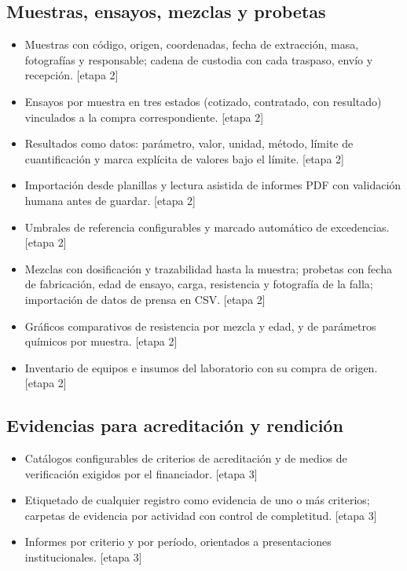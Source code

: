 \documentclass[11pt,a4paper]{article}
\newcommand{\etapa}[1]{\textcolor{grismedio}{[etapa #1]}}
\begin{document}
\subsection{Muestras, ensayos, mezclas y probetas}
\begin{itemize}
\item Muestras con código, origen, coordenadas, fecha de extracción, masa, fotografías y responsable; cadena de custodia con cada traspaso, envío y recepción. \etapa{2}
\item Ensayos por muestra en tres estados (cotizado, contratado, con resultado) vinculados a la compra correspondiente. \etapa{2}
\item Resultados como datos: parámetro, valor, unidad, método, límite de cuantificación y marca explícita de valores bajo el límite. \etapa{2}
\item Importación desde planillas y lectura asistida de informes PDF con validación humana antes de guardar. \etapa{2}
\item Umbrales de referencia configurables y marcado automático de excedencias. \etapa{2}
\item Mezclas con dosificación y trazabilidad hasta la muestra; probetas con fecha de fabricación, edad de ensayo, carga, resistencia y fotografía de la falla; importación de datos de prensa en CSV. \etapa{2}
\item Gráficos comparativos de resistencia por mezcla y edad, y de parámetros químicos por muestra. \etapa{2}
\item Inventario de equipos e insumos del laboratorio con su compra de origen. \etapa{2}
\end{itemize}

\subsection{Evidencias para acreditación y rendición}
\begin{itemize}
\item Catálogos configurables de criterios de acreditación y de medios de verificación exigidos por el financiador. \etapa{3}
\item Etiquetado de cualquier registro como evidencia de uno o más criterios; carpetas de evidencia por actividad con control de completitud. \etapa{3}
\item Informes por criterio y por período, orientados a presentaciones institucionales. \etapa{3}
\end{itemize}
\end{document}
